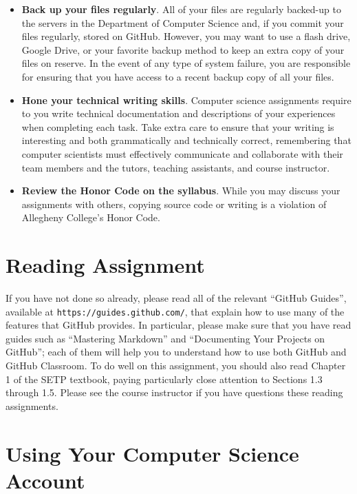 \documentclass[11pt]{article}
\newcommand{\url}[1]{\lstinline{#1}}
\begin{document}
\begin{itemize}
\item {\bf Back up your files regularly}. All of your files are regularly backed-up to the servers in the Department of
  Computer Science and, if you commit your files regularly, stored on GitHub. However, you may want to use a flash
  drive, Google Drive, or your favorite backup method to keep an extra copy of your files on reserve. In the event of
  any type of system failure, you are responsible for ensuring that you have access to a recent backup copy of all your
  files.

\item {\bf Hone your technical writing skills}. Computer science assignments require to you write technical
  documentation and descriptions of your experiences when completing each task. Take extra care to ensure that your
  writing is interesting and both grammatically and technically correct, remembering that computer scientists must
  effectively communicate and collaborate with their team members and the tutors, teaching assistants, and course
  instructor.

\item {\bf Review the Honor Code on the syllabus}. While you may discuss your assignments with others, copying source
  code or writing is a violation of Allegheny College's Honor Code.

\end{itemize}

\section*{Reading Assignment}

If you have not done so already, please read all of the relevant ``GitHub Guides'', available at
\url{https://guides.github.com/}, that explain how to use many of the features that GitHub provides. In particular,
please make sure that you have read guides such as ``Mastering Markdown'' and ``Documenting Your Projects on GitHub'';
each of them will help you to understand how to use both GitHub and GitHub Classroom. To do well on this assignment, you
should also read Chapter 1 of the SETP textbook, paying particularly close attention to Sections 1.3 through 1.5. Please
see the course instructor if you have questions these reading assignments.

\section*{Using Your Computer Science Account}
\end{document}
